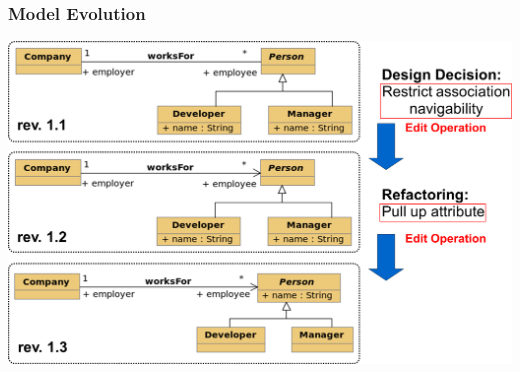 \begin{frame}[t,noframenumbering]
  \frametitle{Model Evolution}
  \begin{flushleft}
  \includegraphics[scale=0.2]{images/uml_example_05_02}
  \end{flushleft}
\end{frame}
